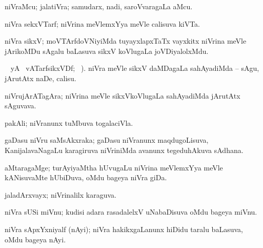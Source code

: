 \bentry
{} 
\gl{\nA}
\expl{}
\bmng
niVraMcu; jalatiVra; samudarx, nadi, saroVvaragaLa aMcu. 
\emng
\eentry

\bentry
{} 
\gl{\nA}
\expl{}
\bmng
niVra sekxVTarf; niVrina meVlemxYya meVle calisuva kiVTa. 
\emng
\eentry

\bentry
{} 
\gl{\nA}
\bmng
niVra sikxV; moVTArfdoVNiyiMda tuyayxlapxTaTx vayxkitx niVrina meVle jArikoMDu sAgalu baLasuva sikxV koVlugaLa joVDiyalolxMdu. 
\emng
\eentry

\bentry
{} 
\gl{\akirx}
 \BUkaq\  yA  \ucAcx\ vATarfsikxVDf; \vakaq\ ).\bmng
niVra meVle sikxV daMDagaLa sahAyadiMda -- sAgu, jArutAtx naDe, calisu. 
\emng
\eentry

\bentry
{} 
\gl{\nA}
\expl{}
\bmng
niVrujArATagAra; niVrina meVle sikxVkoVlugaLa sahAyadiMda jArutAtx sAguvava. 
\emng
\eentry

\bentry
{} 
\gl{\nA}
\expl{}
\bmng
pakAli; niVranunx tuMbuva togalaciVla. 
\emng
\eentry

\bentry
{} 
\gl{\nA}
\expl{}
\bmng
gaDasu niVru saMsAkxraka; gaDasu niVranunx maqdugoLisuva, KanijalavaNagaLu karagiruva niVriniMda avanunx tegeduhAkuva sAdhana. 
\emng
\eentry

\bentry
{} 
\gl{\nA}
\expl{}
\bmng
aMtaragaMge; turAyiyaMtha hUvugaLu niVrina meVlemxYya meVle kANisuvaMte hUbiDuva, oMdu bageya niVra giDa. 
\emng
\eentry

\bentry
{} 
\gl{\gu}
\expl{}
\bmng
jaladArxvayx; niVrinalilx karaguva. 
\emng
\eentry

\bentry
{} 
\gl{\nA}
\expl{}
\bmng
niVra sUSi miVnu; kudisi adara rasadalelxV uNabaDisuva oMdu bageya miVnu. 
\emng
\eentry

\bentry
{} 
\gl{\nA}
\expl{}
\bmng
niVra sApxYxniyalf (nAyi); niVra hakikxgaLanunx hiDidu taralu baLasuva, oMdu bageya nAyi.  
\emng
\eentry

